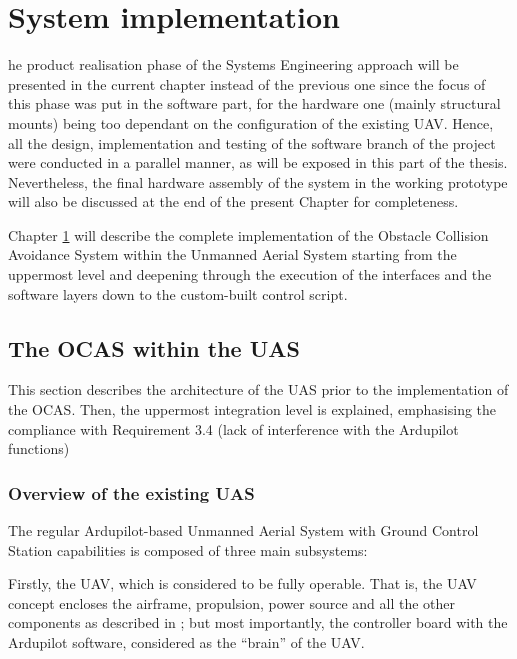 
\let\textcircled=\pgftextcircled
\chapter{System implementation}	\label{chap:implementation}

he product realisation phase of the Systems Engineering approach will be presented in the current chapter instead of the previous one since the focus of this phase was put in the software part, for the hardware one (mainly structural mounts) being too dependant on the configuration of the existing UAV.
Hence, all the design, implementation and testing of the software branch of the project were conducted in a parallel manner, as will be exposed in this part of the thesis.
Nevertheless, the final hardware assembly of the system in the working prototype will also be discussed at the end of the present Chapter for completeness.

Chapter \ref{chap:implementation} will describe the complete implementation of the Obstacle Collision Avoidance System within the Unmanned Aerial System starting from the uppermost level and deepening through the execution of the interfaces and the software layers down to the custom-built control script.


\section{The OCAS within the UAS}

This section describes the architecture of the UAS prior to the implementation of the OCAS.
Then, the uppermost integration level is explained, emphasising the compliance with Requirement 3.4 (lack of interference with the Ardupilot functions)

\subsection{Overview of the existing UAS}

The regular Ardupilot-based Unmanned Aerial System with Ground Control Station capabilities is composed of three main subsystems:

Firstly, the UAV, which is considered to be fully operable.
That is, the UAV concept encloses the airframe, propulsion, power source and all the other components as described in \cite{arteta2015}; but most importantly, the controller board with the Ardupilot software, considered as the ``brain'' of the UAV.

